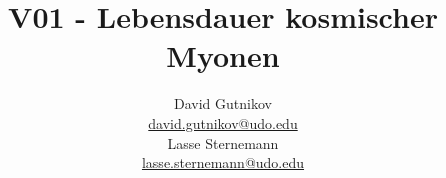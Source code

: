 

\title{V01 - Lebensdauer kosmischer Myonen}
\author{
  David Gutnikov\\
  \href{mailto:david.gutnikov@udo.edu}{david.gutnikov@udo.edu}\\
  Lasse Sternemann\\
  \href{mailto:lasse.sternemann@udo.edu}{lasse.sternemann@udo.edu}
}


    \maketitle
    \newpage
    \tableofcontents
    \newpage

    
    
    
    
    
    

    \clearpage
    \clearpage
    \printbibliography

